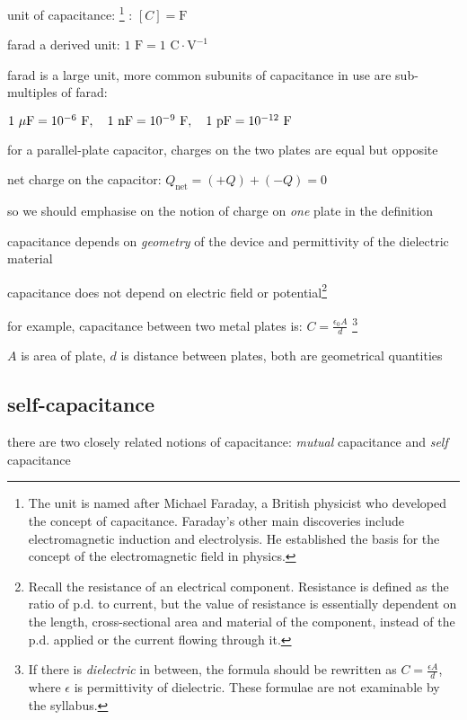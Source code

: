 \cmt unit of capacitance: 
\footnote{The unit is named after Michael Faraday, a British physicist who developed the concept of capacitance. Faraday's other main discoveries include electromagnetic induction and electrolysis. He established the basis for the concept of the electromagnetic field in physics.}
: $[C] = \text{F}$

farad a derived unit: $1 \text{ F} = 1 \text{ C}\cdot\text{V}^{-1}$

farad is a large unit, more common subunits of capacitance in use are sub-multiples of farad:

{
	
\centering

$1 \text{ $\mu$F} = 10^{-6} \text{ F}, \quad 1 \text{ nF} = 10^{-9} \text{ F}, \quad 1 \text{ pF} = 10^{-12} \text{ F}$

}

\cmt for a parallel-plate capacitor, charges on the two plates are equal but opposite

net charge on the capacitor: $Q_\text{net} = (+Q)+(-Q)=0$

so we should emphasise on the notion of charge on \emph{one} plate in the definition



\cmt capacitance depends on \emph{geometry} of the device and permittivity of the dielectric material

capacitance does not depend on electric field or potential\footnote{Recall the resistance of an electrical component. Resistance is defined as the ratio of p.d. to current, but the value of resistance is essentially dependent on the length, cross-sectional area and material of the component, instead of the p.d. applied or the current flowing through it.}

for example, capacitance between two metal plates is: $C=\frac{\epsilon_0 A}{d}$
\footnote{If there is \emph{dielectric} in between, the formula should be rewritten as $C = \frac{\epsilon A}{d}$, where $\epsilon$ is permittivity of dielectric. These formulae are not examinable by the syllabus.}

$A$ is area of plate, $d$ is distance between plates, both are geometrical quantities



\subsection{self-capacitance}

there are two closely related notions of capacitance: \emph{mutual} capacitance and \emph{self} capacitance

